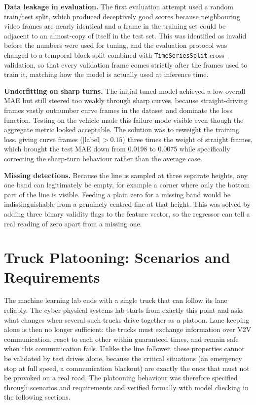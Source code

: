 \documentclass[english]{lni}
\begin{document}
\textbf{Data leakage in evaluation.} The first evaluation attempt used a random train/test split, which produced deceptively good scores because neighbouring video frames are nearly identical and a frame in the training set could be adjacent to an almost-copy of itself in the test set. This was identified as invalid before the numbers were used for tuning, and the evaluation protocol was changed to a temporal block split combined with \texttt{TimeSeriesSplit} cross-validation, so that every validation frame comes strictly after the frames used to train it, matching how the model is actually used at inference time.

\textbf{Underfitting on sharp turns.} The initial tuned model achieved a low overall MAE but still steered too weakly through sharp curves, because straight-driving frames vastly outnumber curve frames in the dataset and dominate the loss function. Testing on the vehicle made this failure mode visible even though the aggregate metric looked acceptable. The solution was to reweight the training loss, giving curve frames ($|$label$| > 0.15$) three times the weight of straight frames, which brought the test MAE down from 0.0198 to 0.0075 while specifically correcting the sharp-turn behaviour rather than the average case.

\textbf{Missing detections.} Because the line is sampled at three separate heights, any one band can legitimately be empty, for example a corner where only the bottom part of the line is visible. Feeding a plain zero for a missing band would be indistinguishable from a genuinely centred line at that height. This was solved by adding three binary validity flags to the feature vector, so the regressor can tell a real reading of zero apart from a missing one.

\section{Truck Platooning: Scenarios and Requirements}\label{sec:scenarios}
The machine learning lab ends with a single truck that can follow its lane reliably. The cyber-physical systems lab starts from exactly this point and asks what changes when several such trucks drive together as a platoon. Lane keeping alone is then no longer sufficient: the trucks must exchange information over V2V communication, react to each other within guaranteed times, and remain safe when this communication fails. Unlike the line follower, these properties cannot be validated by test drives alone, because the critical situations (an emergency stop at full speed, a communication blackout) are exactly the ones that must not be provoked on a real road. The platooning behaviour was therefore specified through scenarios and requirements and verified formally with model checking in the following sections.
\end{document}
